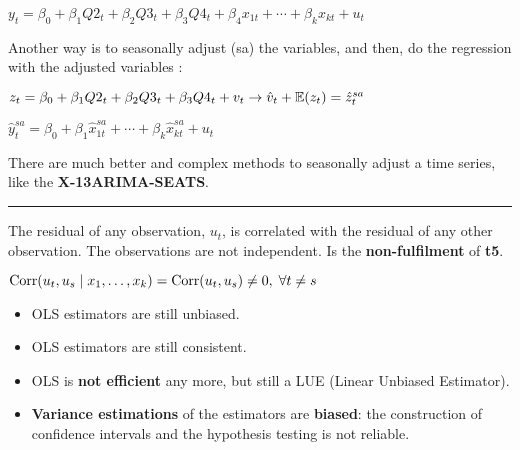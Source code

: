 \begin{f}[Seasonality]
\begin{center}
	\(y_{t} = \beta_{0} + \beta_{1} Q2_{t} + \beta_{2} Q3_{t} + \beta_{3} Q4_{t} + \beta_{4} x_{1t} + \cdots + \beta_{k} x_{kt} + u_{t}\)
\end{center}

Another way is to seasonally adjust (sa) the variables, and then, do the regression with the adjusted variables :

\begin{center}
	\(z_{t} = \beta_{0} + \beta_{1} Q2_{t} + \beta_{2} Q3_{t} + \beta_{3} Q4_{t} + v_{t} \rightarrow \hat{v}_{t} + \mathbb{E}(z_{t}) = \hat{z}_{t}^{sa}\)
	
	\(\hat{y}_{t}^{sa}= \beta_{0} + \beta_{1} \hat{x}_{1t}^{sa} + \cdots + \beta_{k} \hat{x}_{kt}^{sa} + u_{t}\)
\end{center}

There are much better and complex methods to seasonally adjust a time series, like the \textbf{X-13ARIMA-SEATS}.

\end{f}  \hrule

\begin{f}[Autocorrelation]

The residual of any observation, \(u_{t}\), is correlated with the residual of any other observation. The observations are not independent. Is the \textbf{non-fulfilment} of \textbf{t5}.

\begin{center}
	\(\mathrm{Corr}(u_{t}, u_{s} \mid x_{1}, \ldots, x_{k}) = \mathrm{Corr}(u_{t}, u_{s}) \neq 0, \; \forall t \neq s\)
\end{center}

\end{f}    
\begin{f}[Consequences]

\begin{itemize}[leftmargin=*]
	\item OLS estimators are still unbiased.
	\item OLS estimators are still consistent.
	\item OLS is \textbf{not efficient} any more, but still a LUE (Linear Unbiased Estimator).
	\item \textbf{Variance estimations} of the estimators are \textbf{biased}: the construction of confidence intervals and the hypothesis testing is not reliable.
\end{itemize}

\end{f}    

